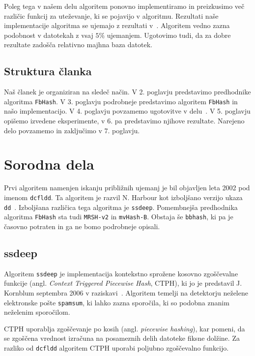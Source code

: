 \documentclass{acm_proc_article-sp}
\begin{document}
Poleg tega v našem delu algoritem ponovno implementiramo in preizkusimo več različic funkcij za uteževanje, ki se pojavijo v algoritmu. Rezultati naše implementacije algoritma se ujemajo z rezultati v~\cite{fbhash}. Algoritem vedno zazna podobnost v datotekah z vsaj $5\%$ ujemanjem. Ugotovimo tudi, da za dobre rezultate zadošča relativno majhna baza datotek.

\subsection{Struktura članka}

Naš članek je organiziran na sledeč način. V 2. poglavju predstavimo predhodnike algoritma \texttt{FbHash}. V 3. poglavju podrobneje predstavimo algoritem \texttt{FbHash} in našo implementacijo. V 4. poglavju povzamemo ugotovitve v delu~\cite{fbhash}. V 5. poglavju opišemo izvedene eksperimente, v 6. pa predstavimo njihove rezultate. Narejeno delo povzamemo in zaključimo v 7. poglavju.

\section{Sorodna dela}
Prvi algoritem namenjen iskanju približnih ujemanj je bil objavljen leta 2002 pod imenom \texttt{dcfldd}. Ta algoritem je razvil N. Harbour kot izboljšano verzijo ukaza \texttt{dd}~\cite{dcfldd}. Izboljšana različica tega algoritma je \texttt{ssdeep}. Pomembnejša predhodnika algoritma \texttt{FbHash} sta tudi \texttt{MRSH-v2} in \texttt{mvHash-B}. Obstaja še \texttt{bbhash}, ki pa je časovno potraten in ga ne bomo podrobneje opisali.

\subsection{ssdeep}
Algoritem \texttt{ssdeep} je implementacija kontekstno sprožene ko\-so\-vno zgoščevalne funkcije (angl. \emph{Context Triggered Piecewise Hash}, CTPH), ki jo je predstavil J. Kornblum septembra 2006 v raziskavi~\cite{kornblum:ctph}. Algoritem temelji na detektorju neželene elektronske pošte \texttt{spamsum}, ki lahko zazna sporočila, ki so podobna znanim neželenim sporočilom.

CTPH uporablja zgoščevanje po kosih (angl. \emph{piecewise hashing}), kar pomeni, da se zgoščena vrednost izračuna na po\-sa\-me\-znih delih datoteke fiksne dolžine. Za razliko od \texttt{dcfldd} algoritem CTPH uporabi poljubno zgoščevalno funkcijo.
\end{document}
